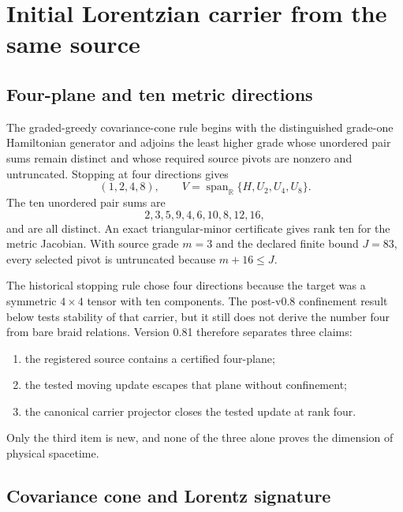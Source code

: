 \documentclass[12pt,a4paper,twoside]{article}
\begin{document}
\section{Initial Lorentzian carrier from the same source}

\subsection{Four-plane and ten metric directions}

The graded-greedy covariance-cone rule begins with the distinguished grade-one Hamiltonian generator and adjoins the least higher grade whose unordered pair sums remain distinct and whose required source pivots are nonzero and untruncated. Stopping at four directions gives
\begin{equation}
(1,2,4,8),
\qquad
V=\operatorname{span}_{\mathbb R}\{H,U_2,U_4,U_8\}.
\label{eq:fourplane}
\end{equation}
The ten unordered pair sums are
\begin{equation}
2,3,5,9,4,6,10,8,12,16,
\end{equation}
and are all distinct. An exact triangular-minor certificate gives rank ten for the metric Jacobian. With source grade $m=3$ and the declared finite bound $J=83$, every selected pivot is untruncated because $m+16\leq J$.

The historical stopping rule chose four directions because the target was a symmetric $4\times4$ tensor with ten components. The post-v0.8 confinement result below tests stability of that carrier, but it still does not derive the number four from bare braid relations. Version 0.81 therefore separates three claims:
\begin{enumerate}
  \item the registered source contains a certified four-plane;
  \item the tested moving update escapes that plane without confinement;
  \item the canonical carrier projector closes the tested update at rank four.
\end{enumerate}
Only the third item is new, and none of the three alone proves the dimension of physical spacetime.

\subsection{Covariance cone and Lorentz signature}
\end{document}
